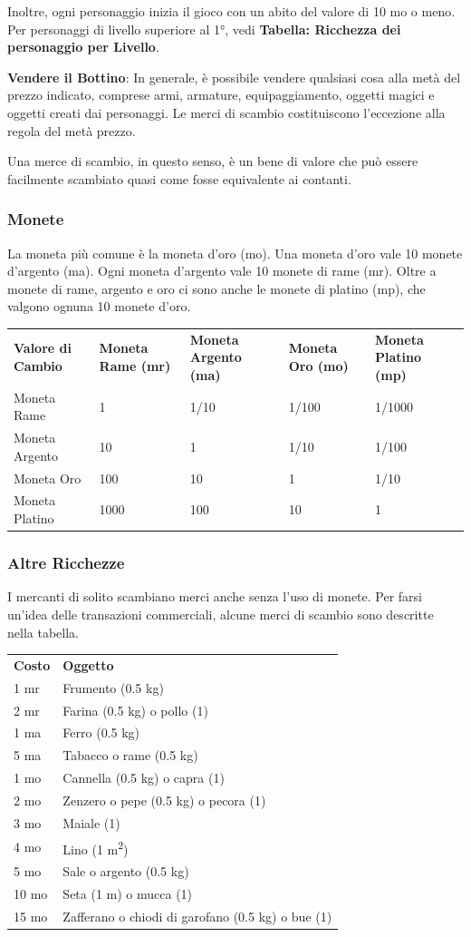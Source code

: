 \documentclass[a4paper,11pt,twoside,openany]{book}
\begin{document}
Inoltre, ogni personaggio inizia il gioco con un abito del valore di 10 mo o meno. Per personaggi di livello superiore al 1°, vedi \textbf{Tabella: Ricchezza dei personaggio per Livello}.

\medskip

\textbf{Vendere il Bottino}: In generale, è possibile vendere qualsiasi cosa alla metà del prezzo indicato, comprese armi, armature, equipaggiamento, oggetti magici e oggetti creati dai personaggi. Le merci di scambio costituiscono l'eccezione alla regola del metà prezzo.

Una merce di scambio, in questo senso, è un bene di valore che può essere facilmente scambiato quasi come fosse equivalente ai contanti.

\subsubsection{Monete}

La moneta più comune è la moneta d'oro (mo). Una moneta d'oro vale 10 monete d'argento (ma). Ogni moneta d'argento vale 10 monete di rame (mr). Oltre a monete di rame, argento e oro ci sono anche le monete di platino (mp), che valgono ognuna 10 monete d'oro.

\begin{tabular}{L{3cm} L{3cm} L{3cm} L{3cm} L{3cm}}
	\toprule
	\textbf{Valore di Cambio} & \textbf{Moneta Rame (mr)} & \textbf{Moneta Argento (ma)} & \textbf{Moneta Oro (mo)} & \textbf{Moneta Platino (mp)}\tabularnewline
	Moneta Rame& 1& 1/10& 1/100& 1/1000\tabularnewline
	Moneta Argento  & 10    & 1   & 1/10 & 1/100\tabularnewline
	Moneta Oro & 100   & 10  & 1    & 1/10\tabularnewline
	Moneta Platino  & 1000  & 100 & 10   & 1\tabularnewline
\end{tabular}

\subsubsection{Altre Ricchezze}

I mercanti di solito scambiano merci anche senza l'uso di monete.
Per farsi un'idea delle transazioni commerciali, alcune merci di scambio sono descritte nella tabella.

\medskip

\begin{tabular}{ll}
	\toprule
	\textbf{Costo} & \textbf{Oggetto}\tabularnewline
	1 mr & Frumento (0.5 kg)\tabularnewline
	2 mr & Farina (0.5 kg) o pollo (1)\tabularnewline
	1 ma & Ferro (0.5 kg)\tabularnewline
	5 ma & Tabacco o rame (0.5 kg)\tabularnewline
	1 mo & Cannella (0.5 kg) o capra (1)\tabularnewline
	2 mo & Zenzero o pepe (0.5 kg) o pecora (1)\tabularnewline
	3 mo & Maiale (1)\tabularnewline
	4 mo & Lino (1 m\textsuperscript{2})\tabularnewline
	5 mo & Sale o argento (0.5 kg)\tabularnewline
	10 mo& Seta (1 m) o mucca (1)\tabularnewline
	15 mo& Zafferano o chiodi di garofano (0.5 kg) o bue (1)\tabularnewline
\end{tabular}
\end{document}
